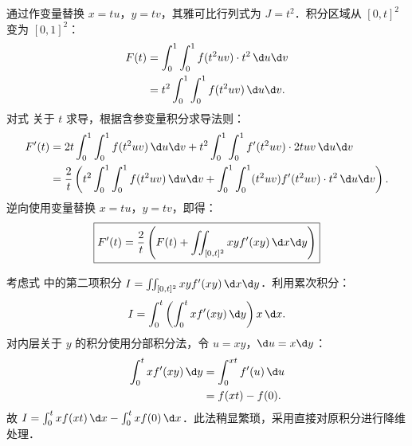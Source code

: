 \begin{myproof}
    通过作变量替换 $x = tu$，$y = tv$，其雅可比行列式为 $J = t^2$．积分区域从 $[0,t]^2$ 变为 $[0,1]^2$：
    \begin{equation}
        \begin{aligned}
            F(t) & = \int_0^1 \int_0^1 f(t^2 uv) \cdot t^2 \, \d u \d v \\
                 & = t^2 \int_0^1 \int_0^1 f(t^2 uv) \, \d u \d v.
        \end{aligned} \label{eq:F-t-form}
    \end{equation}
    对式  关于 $t$ 求导，根据含参变量积分求导法则：
    \begin{equation}
        \begin{aligned}
            F'(t) & = 2t \int_0^1 \int_0^1 f(t^2 uv) \, \d u \d v + t^2 \int_0^1 \int_0^1 f'(t^2 uv) \cdot 2t uv \, \d u \d v                                 \\
                  & = \frac{2}{t} \left( t^2 \int_0^1 \int_0^1 f(t^2 uv) \, \d u \d v + \int_0^1 \int_0^1 (t^2 uv) f'(t^2 uv) \cdot t^2 \, \d u \d v \right).
        \end{aligned}
    \end{equation}
    逆向使用变量替换 $x = tu$，$y = tv$，即得：
    \begin{equation}
        \boxed{F'(t) = \frac{2}{t} \left( F(t) + \iint_{[0,t]^2} xy f'(xy) \, \d x \d y \right)}
    \end{equation}

    考虑式  中的第二项积分 $I = \iint_{[0,t]^2} xy f'(xy) \, \d x \d y$．利用累次积分：
    \begin{equation}
        I = \int_0^t \left( \int_0^t x f'(xy) \, \d y \right) x \, \d x.
    \end{equation}
    对内层关于 $y$ 的积分使用分部积分法，令 $u = xy$，$ \d u = x \d y$：
    \begin{equation}
        \begin{aligned}
            \int_0^t x f'(xy) \, \d y & = \int_0^{xt} f'(u) \, \d u \\
                                      & = f(xt) - f(0).
        \end{aligned}
    \end{equation}
    故 $I = \int_0^t x f(xt) \, \d x - \int_0^t x f(0) \, \d x$．此法稍显繁琐，采用直接对原积分进行降维处理．


\end{myproof}
